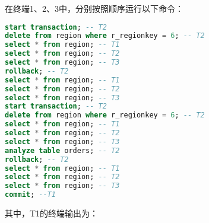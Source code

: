 \documentclass{article}
\begin{document}
在终端1、2、3中，分别按照顺序运行以下命令：

\begin{lstlisting}[language=sql]
start transaction; -- T2
delete from region where r_regionkey = 6; -- T2
select * from region; -- T1
select * from region; -- T2
select * from region; -- T3
rollback; -- T2
select * from region; -- T1
select * from region; -- T2
select * from region; -- T3
start transaction; -- T2
delete from region where r_regionkey = 6; -- T2
select * from region; -- T1
select * from region; -- T2
select * from region; -- T3
analyze table orders; -- T2
rollback; -- T2
select * from region; -- T1
select * from region; -- T2
select * from region; -- T3
commit; --T1
\end{lstlisting}

其中，T1的终端输出为：
\end{document}
